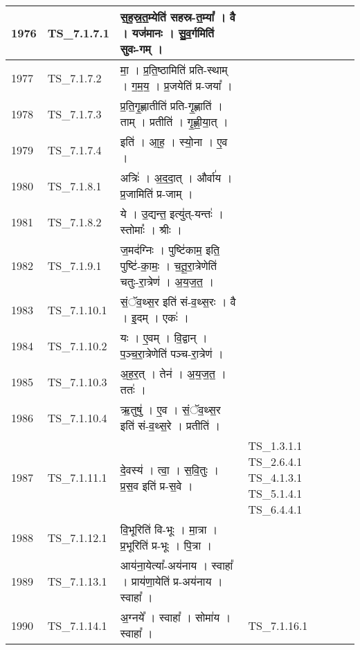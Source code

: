 \documentclass[17pt]{extarticle}
\begin{document}
\begin{longtable}{||p{0.4in}||p{0.9in}||p{4.0in}||p{0.9in}||}
        \hline
            1976 & TS\_7.1.7.1 & स॒ह॒स्र॒त॒म्येति॑ सहस्र{-}त॒म्या᳚   ।   वै   ।   यज॑मानः   ।   सु॒व॒र्गमिति॑ सुवः{-}गम्   ।    &      \\
        \hline
            1977 & TS\_7.1.7.2 & मा॒   ।   प्र॒ति॒ष्ठामिति॑ प्रति{-}स्थाम्   ।   ग॒म॒य॒   ।   प्र॒जयेति॑ प्र{-}जया᳚   ।    &      \\
        \hline
            1978 & TS\_7.1.7.3 & प्र॒ति॒गृ॒ह्णातीति॑ प्रति{-}गृ॒ह्णाति॑   ।   ताम्   ।   प्रतीति॑   ।   गृ॒ह्णी॒या॒त्   ।    &      \\
        \hline
            1979 & TS\_7.1.7.4 & इति॑   ।   आ॒ह॒   ।   स्यो॒ना   ।   ए॒व   ।    &      \\
        \hline
            1980 & TS\_7.1.8.1 & अत्रिः॑   ।   अ॒द॒दा॒त्   ।   और्वा॑य   ।   प्र॒जामिति॑ प्र{-}जाम्   ।    &      \\
        \hline
            1981 & TS\_7.1.8.2 & ये   ।   उ॒द्यन्त॒ इत्यु॑त्{-}यन्तः॑   ।   स्तोमाः᳚   ।   श्रीः   ।    &      \\
        \hline
            1982 & TS\_7.1.9.1 & ज॒मद॑ग्निः   ।   पुष्टि॑काम॒ इति॒ पुष्टि॑{-}का॒मः॒   ।   च॒तू॒रा॒त्रेणेति॑ चतुः{-}रा॒त्रेण॑   ।   अ॒य॒ज॒त॒   ।    &      \\
        \hline
            1983 & TS\_7.1.10.1 & सं॒ॅव॒थ्स॒र इति॑ सं{-}व॒थ्स॒रः   ।   वै   ।   इ॒दम्   ।   एकः॑   ।    &      \\
        \hline
            1984 & TS\_7.1.10.2 & यः   ।   ए॒वम्   ।   वि॒द्वान्   ।   प॒ञ्च॒रा॒त्रेणेति॑ पञ्च{-}रा॒त्रेण॑   ।    &      \\
        \hline
            1985 & TS\_7.1.10.3 & अ॒ह॒र॒त्   ।   तेन॑   ।   अ॒य॒ज॒त॒   ।   ततः॑   ।    &      \\
        \hline
            1986 & TS\_7.1.10.4 & ऋ॒तुषु॑   ।   ए॒व   ।   सं॒ॅव॒थ्स॒र इति॑ सं{-}व॒थ्स॒रे   ।   प्रतीति॑   ।    &      \\
        \hline
            1987 & TS\_7.1.11.1 & दे॒वस्य॑   ।   त्वा॒   ।   स॒वि॒तुः   ।   प्र॒स॒व इति॑ प्र{-}स॒वे   ।    & TS\_1.3.1.1 TS\_2.6.4.1 TS\_4.1.3.1 TS\_5.1.4.1 TS\_6.4.4.1        \\
        \hline
            1988 & TS\_7.1.12.1 & वि॒भूरिति॑ वि{-}भूः   ।   मा॒त्रा   ।   प्र॒भूरिति॑ प्र{-}भूः   ।   पि॒त्रा   ।    &      \\
        \hline
            1989 & TS\_7.1.13.1 & आय॑ना॒येत्या᳚{-}अय॑नाय   ।   स्वाहा᳚   ।   प्राय॑णा॒येति॑ प्र{-}अय॑नाय   ।   स्वाहा᳚   ।    &      \\
        \hline
            1990 & TS\_7.1.14.1 & अ॒ग्नये᳚   ।   स्वाहा᳚   ।   सोमा॑य   ।   स्वाहा᳚   ।    &  TS\_7.1.16.1       \\

\end{longtable}
\end{document}
